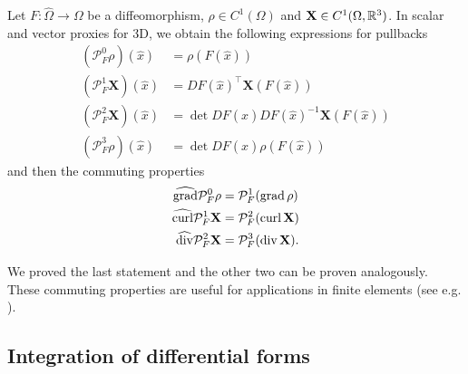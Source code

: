 \documentclass[../master_thesis.tex]{subfiles}
\begin{document}
\begin{proposition}\label{prop:pullback_and_commutativity_3D}
    Let $F: \hat{\Omega} \rightarrow \Omega$ be a diffeomorphism, 
    $\rho \in C^1(\Omega)$ and $\mathbf{X} \in C^1(\Omega, \mathbb{R}^3)$.
    In scalar and vector proxies for 3D, we obtain the following expressions for 
    pullbacks
    \begin{align*}
        (\mathcal{P}^0_F \rho)(\hat{x}) &= \rho(F(\hat{x}))
        \\ (\mathcal{P}^1_F \mathbf{X})(\hat{x}) &= DF(\hat{x})^\top \mathbf{X}(F(\hat{x}))
        \\ (\mathcal{P}^2_F \mathbf{X})(\hat{x}) &= \det DF(\hat{x}) DF(\hat{x})^{-1} \mathbf{X}(F(\hat{x}))
        \\ (\mathcal{P}^3_F \rho)(\hat{x}) &= \det DF(\hat{x}) \rho(F(\hat{x}))
    \end{align*}
    and then the commuting properties
    \begin{align*}
        \widehat{\operatorname{grad}} \mathcal{P}^0_F \rho &= \mathcal{P}^1_F (\operatorname{grad} \rho)
        \\ \widehat{\mathbf{\operatorname{curl}}} \mathcal{P}^1_F \mathbf{X} &= \mathcal{P}^2_F (\operatorname{curl} \mathbf{X})
        \\ \widehat{\operatorname{div}} \mathcal{P}^2_F \mathbf{X} &= \mathcal{P}^3_F (\operatorname{div} \mathbf{X}).
    \end{align*}
\end{proposition}
We proved the last statement and the other two can be proven analogously. 
These commuting properties are useful for applications in finite elements
(see e.g. \cite[Sec.\,14.3]{ern_guermond}).





\subsection{Integration of differential forms}\label{sec:integration_of_differential_forms}
\end{document}
